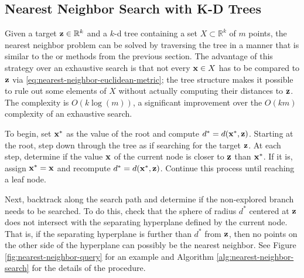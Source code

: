\subsection*{Nearest Neighbor Search with K-D Trees} %

Given a target $\mathbf{z}\in\mathbb{R}^k$ and a $k$-d tree containing a set $X\subset\mathbb{R}^k$ of $m$ points, the nearest neighbor problem can be solved by traversing the tree in a manner that is similar to the  or  methods from the previous section.
The advantage of this strategy over an exhaustive search is that not every $\mathbf{x}\in X$ has to be compared to $\mathbf{z}$ via \eqref{eq:nearest-neighbor-euclidean-metric}; the tree structure makes it possible to rule out some elements of $X$ without actually computing their distances to $\mathbf{z}$.
The complexity is $O(k\log(m))$, a significant improvement over the $O(km)$ complexity of an exhaustive search.

To begin, set $\mathbf{x}^*$ as the value of the root and compute $d^* = d(\mathbf{x}^*,\mathbf{z})$.
Starting at the root, step down through the tree as if searching for the target $\mathbf{z}$.
At each step, determine if the value $\mathbf{x}$ of the current node is closer to $\mathbf{z}$ than $\mathbf{x}^*$.
If it is, assign $\mathbf{x}^* = \mathbf{x}$ and recompute $d^* = d(\mathbf{x}^*, \mathbf{z})$.
Continue this process until reaching a leaf node.

Next, backtrack along the search path and determine if the non-explored branch needs to be searched.
To do this, check that the sphere of radius $d^*$ centered at $\mathbf{z}$ does not intersect with the separating hyperplane defined by the current node.
That is, if the separating hyperplane is further than $d^*$ from $\mathbf{z}$, then no points on the other side of the hyperplane can possibly be the nearest neighbor. %
See Figure \ref{fig:nearest-neighbor-query} for an example and Algorithm \ref{alg:nearest-neighbor-search} for the details of the procedure.

